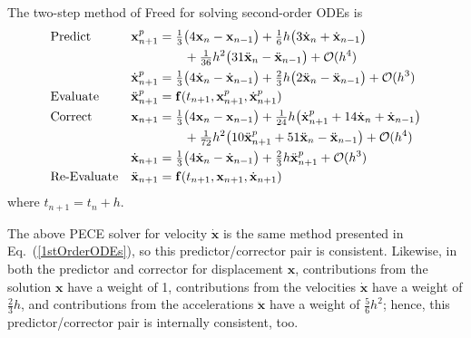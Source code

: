 The two-step method of Freed \cite{Freed17a} for solving second-order ODEs is
\begin{subequations}
    \label{pairedMethods}
    \begin{align}
    \mbox{} & \text{Predict} &
    \mathbf{x}_{n+1}^p & = \tfrac{1}{3} \bigl(
    4 \mathbf{x}_n - \mathbf{x}_{n-1} \bigr) + 
    \tfrac{1}{6} h \bigl( 3 \dot{\mathbf{x}}_n + 
    \dot{\mathbf{x}}_{n-1} \bigr) \notag \\ 
    \mbox{} & & & \qquad + 
    \tfrac{1}{36} h^2 \bigl( 31 \ddot{\mathbf{x}}_n - 
    \ddot{\mathbf{x}}_{n-1} \bigr) + \mathcal{O} (h^4) 
    \label{displacementPredictor} \\
    \mbox{} & &
    \dot{\mathbf{x}}_{n+1}^p & = \tfrac{1}{3} 
    \bigl( 4 \dot{\mathbf{x}}_n - \dot{\mathbf{x}}_{n-1} \bigr) + 
    \tfrac{2}{3} h \bigl( 2\ddot{\mathbf{x}}_n - \ddot{\mathbf{x}}_{n-1} 
    \bigr) + \mathcal{O} (h^3)
    \label{velocityPredictor} \\
    \mbox{} & \text{Evaluate} &
    \ddot{\mathbf{x}}^p_{n+1} & = \mathbf{f} (t_{n+1}, \mathbf{x}^p_{n+1}, \dot{\mathbf{x}}^p_{n+1}) 
    \label{2ndEvaluate} \\
    \mbox{} & \text{Correct} & 
    \mathbf{x}_{n+1} & = \tfrac{1}{3} \bigl(
    4  \mathbf{x}_n - \mathbf{x}_{n-1} \bigr) +
    \tfrac{1}{24} h \bigl( \dot{\mathbf{x}}^p_{n+1} +
    14 \dot{\mathbf{x}}_n + \dot{\mathbf{x}}_{n-1} \bigr) 
    \notag \\
    \mbox{} & & & \qquad +
    \tfrac{1}{72} h^2 \bigl( 10 \ddot{\mathbf{x}}^p_{n+1} + 
    51 \ddot{\mathbf{x}}_n - \ddot{\mathbf{x}}_{n-1} \bigr) + 
    \mathcal{O} (h^4)
    \label{displacementCorrector} \\ 
    \mbox{} & &
    \dot{\mathbf{x}}_{n+1} & = \tfrac{1}{3} 
    \bigl( 4 \dot{\mathbf{x}}_n - \dot{\mathbf{x}}_{n-1} \bigr) + 
    \tfrac{2}{3} h \ddot{\mathbf{x}}^p_{n+1} + \mathcal{O} (h^3)
    \label{velocityCorrector} \\
    \mbox{} & \text{Re-Evaluate} & 
    \ddot{\mathbf{x}}_{n+1} & = \mathbf{f} (t_{n+1}, \mathbf{x}_{n+1}, \dot{\mathbf{x}}_{n+1})
    \label{2ndReEvaluate}
    \end{align}
\end{subequations}
where $t_{n+1} = t_n + h$.

The above PECE solver for velocity $\dot{\mathbf{x}}$ is the same method presented in Eq.~(\ref{1stOrderODEs}), so this predictor\slash corrector pair is consistent.  Likewise, in both the predictor and corrector for displacement $\mathbf{x}$, contributions from the solution $\mathbf{x}$ have a weight of 1, contributions from the velocities $\dot{\mathbf{x}}$ have a weight of $\tfrac{2}{3} h$, and contributions from the accelerations $\ddot{\mathbf{x}}$ have a weight of $\tfrac{5}{6} h^2$; hence, this predictor\slash corrector pair is internally consistent, too.

